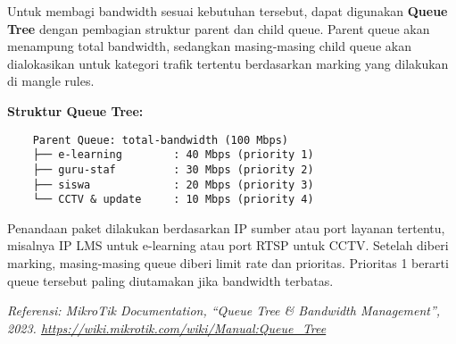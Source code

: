 \begin{enumerate}
    Untuk membagi bandwidth sesuai kebutuhan tersebut, dapat digunakan \textbf{Queue Tree} dengan pembagian struktur parent dan child queue. Parent queue akan menampung total bandwidth, sedangkan masing-masing child queue akan dialokasikan untuk kategori trafik tertentu berdasarkan marking yang dilakukan di mangle rules.

    \textbf{Struktur Queue Tree:}
    \begin{verbatim}
    Parent Queue: total-bandwidth (100 Mbps)
    ├── e-learning        : 40 Mbps (priority 1)
    ├── guru-staf         : 30 Mbps (priority 2)
    ├── siswa             : 20 Mbps (priority 3)
    └── CCTV & update     : 10 Mbps (priority 4)
    \end{verbatim}

    Penandaan paket dilakukan berdasarkan IP sumber atau port layanan tertentu, misalnya IP LMS untuk e-learning atau port RTSP untuk CCTV. Setelah diberi marking, masing-masing queue diberi limit rate dan prioritas. Prioritas 1 berarti queue tersebut paling diutamakan jika bandwidth terbatas.

    \textit{Referensi: MikroTik Documentation, ``Queue Tree \& Bandwidth Management'', 2023. \url{https://wiki.mikrotik.com/wiki/Manual:Queue_Tree}}
\end{enumerate}
